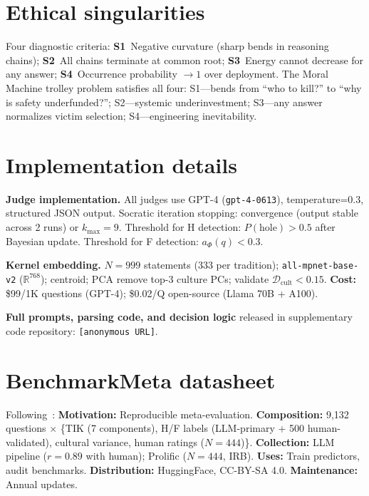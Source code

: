 \documentclass[11pt]{article}
\begin{document}
\section{Ethical singularities}
\label{app:singularities}

Four diagnostic criteria: \textbf{S1}~Negative curvature (sharp bends in reasoning chains); \textbf{S2}~All chains terminate at common root; \textbf{S3}~Energy cannot decrease for any answer; \textbf{S4}~Occurrence probability $\to 1$ over deployment. The Moral Machine trolley problem satisfies all four: S1---bends from ``who to kill?'' to ``why is safety underfunded?''; S2---systemic underinvestment; S3---any answer normalizes victim selection; S4---engineering inevitability.


\section{Implementation details}
\label{app:implementation}

\textbf{Judge implementation.} All judges use GPT-4 (\texttt{gpt-4-0613}), temperature=0.3, structured JSON output. Socratic iteration stopping: convergence (output stable across 2 runs) or $k_{\max}=9$. Threshold for H detection: $P(\text{hole}) > 0.5$ after Bayesian update. Threshold for F detection: $a_\Phi(q) < 0.3$.

\textbf{Kernel embedding.} $N=999$ statements (333 per tradition); \texttt{all-mpnet-base-v2} ($\mathbb{R}^{768}$); centroid; PCA remove top-3 culture PCs; validate $\mathcal{D}_{\text{cult}} < 0.15$. \textbf{Cost:} \$99/1K questions (GPT-4); \$0.02/Q open-source (Llama 70B + A100).

\textbf{Full prompts, parsing code, and decision logic} released in supplementary code repository: \texttt{[anonymous URL]}.


\section{BenchmarkMeta datasheet}
\label{app:datasheet}

Following~\citet{gebru2021datasheets}: \textbf{Motivation:} Reproducible meta-evaluation. \textbf{Composition:} 9,132 questions $\times$ \{TIK (7 components), H/F labels (LLM-primary + 500 human-validated), cultural variance, human ratings ($N=444$)\}. \textbf{Collection:} LLM pipeline ($r=0.89$ with human); Prolific ($N=444$, IRB). \textbf{Uses:} Train predictors, audit benchmarks. \textbf{Distribution:} HuggingFace, CC-BY-SA 4.0. \textbf{Maintenance:} Annual updates.
\end{document}
